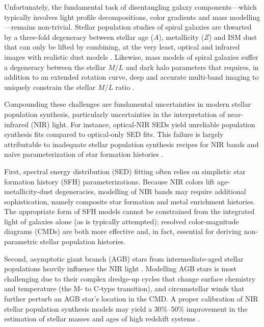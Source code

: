\documentclass[iop,tighten]{emulateapj}
\begin{document}
Unfortunately, the fundamental task of disentangling galaxy components---which typically involves light profile decompositions, color gradients and mass modelling---remains non-trivial.
Stellar population studies of spiral galaxies are thwarted by a three-fold degeneracy between stellar age ($A$), metallicity ($Z$) and ISM dust that can only be lifted by combining, at the very least, optical and infrared images with realistic dust models \citep{de-Jong:1996b,MacArthur:2004,Pforr:2012}.
Likewise, mass models of spiral galaxies suffer a degeneracy between the stellar $M/L$ and dark halo parameters that requires, in addition to an extended rotation curve, deep and accurate multi-band imaging to uniquely constrain the stellar $M/L$ ratio \citep{Dutton:2005,Courteau:2013}. 

Compounding these challenges are fundamental uncertainties in modern stellar population synthesis, particularly uncertainties in the interpretation of near-infrared (NIR) light.
For instance, optical-NIR SEDs yield unreliable population synthesis fits compared to optical-only SED fits.
This failure is largely attributable to inadequate stellar population synthesis recipes for NIR bands and naive parameterization of star formation histories \citep{Taylor:2011,Courteau:2013}.

First, spectral energy distribution (SED) fitting often relies on simplistic star formation history (SFH) parameterizations.
Because NIR colors lift age-metallicity-dust degeneracies, modelling of NIR bands may require additional sophistication, namely composite star formation and metal enrichment histories.
The appropriate form of SFH models cannot be constrained from the integrated light of galaxies alone (as is typically attempted); resolved color-magnitude diagrams (CMDs) are both more effective and, in fact, essential for deriving non-parametric stellar population histories. 

Second, asymptotic giant branch (AGB) stars from intermediate-aged stellar populations heavily influence the NIR light \citep{Maraston:1998}.
Modelling AGB stars is most challenging due to their complex dredge-up cycles that change surface chemistry and temperature (the M- to C-type transition), and circumstellar winds that further perturb an AGB star's location in the CMD.
A proper calibration of NIR stellar population synthesis models \cite[\textit{e.g.}][Charlot \& Bruzual in prep.]{Maraston:2005,Marigo:2008} may yield a 30\%--50\% improvement in the estimation of stellar masses and ages of high redshift systems \citep[\textit{e.g.}][]{Maraston:2006,Bruzual:2007,Conroy:2010b,Conroy:2013}.
\end{document}
